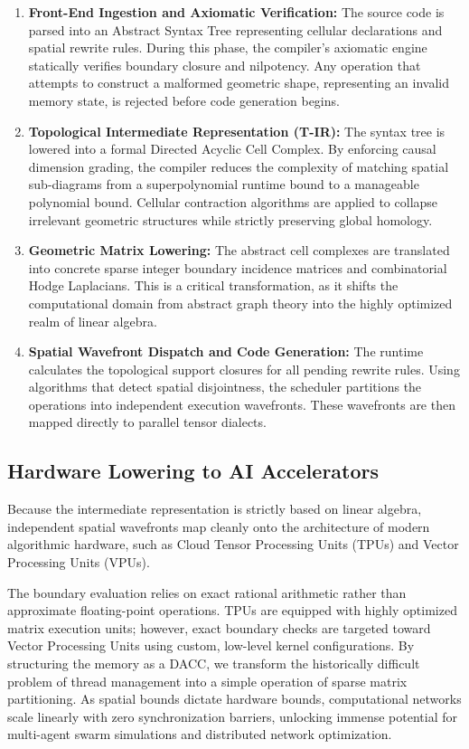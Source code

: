 \documentclass[11pt, a4paper]{article}
\begin{document}
\begin{enumerate}
    \item \textbf{Front-End Ingestion and Axiomatic Verification:} The source code is parsed into an Abstract Syntax Tree representing cellular declarations and spatial rewrite rules. During this phase, the compiler's axiomatic engine statically verifies boundary closure and nilpotency. Any operation that attempts to construct a malformed geometric shape, representing an invalid memory state, is rejected before code generation begins.
    
    \item \textbf{Topological Intermediate Representation (T-IR):} The syntax tree is lowered into a formal Directed Acyclic Cell Complex. By enforcing causal dimension grading, the compiler reduces the complexity of matching spatial sub-diagrams from a superpolynomial runtime bound to a manageable polynomial bound. Cellular contraction algorithms are applied to collapse irrelevant geometric structures while strictly preserving global homology.
    
    \item \textbf{Geometric Matrix Lowering:} The abstract cell complexes are translated into concrete sparse integer boundary incidence matrices and combinatorial Hodge Laplacians. This is a critical transformation, as it shifts the computational domain from abstract graph theory into the highly optimized realm of linear algebra.
    
    \item \textbf{Spatial Wavefront Dispatch and Code Generation:} The runtime calculates the topological support closures for all pending rewrite rules. Using algorithms that detect spatial disjointness, the scheduler partitions the operations into independent execution wavefronts. These wavefronts are then mapped directly to parallel tensor dialects.
\end{enumerate}

\subsection{Hardware Lowering to AI Accelerators}
Because the intermediate representation is strictly based on linear algebra, independent spatial wavefronts map cleanly onto the architecture of modern algorithmic hardware, such as Cloud Tensor Processing Units (TPUs) and Vector Processing Units (VPUs).

The boundary evaluation relies on exact rational arithmetic rather than approximate floating-point operations. TPUs are equipped with highly optimized matrix execution units; however, exact boundary checks are targeted toward Vector Processing Units using custom, low-level kernel configurations. By structuring the memory as a DACC, we transform the historically difficult problem of thread management into a simple operation of sparse matrix partitioning. As spatial bounds dictate hardware bounds, computational networks scale linearly with zero synchronization barriers, unlocking immense potential for multi-agent swarm simulations and distributed network optimization.
\end{document}
